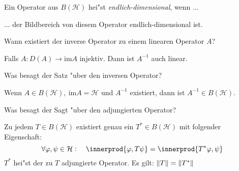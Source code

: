 \documentclass[9pt]{article}
\DeclarePairedDelimiter{\innerprod}\langle\rangle
\newcommand{\Hi}{\mathcal{H}}
\newenvironment{field}{}{\newpage}
\newif\ifnote
\newenvironment{note}{\notetrue}{\notefalse}
\newcommand{\localtag}{}
\newcommand{\globaltag}{}
\newcommand{\uuid}{}
\newcommand{\tags}[1]{
    \ifnote 
        \renewcommand{\localtag}{#1}
    \else
        \renewcommand{\globaltag}{#1}
    \fi 
    }
\newcommand{\xplain}[1]{\renewcommand{\uuid}{#1}}
\begin{document}
	\begin{note}
		\xplain{b514ddca-b0be-4779-b1ea-10bc1ff4d0f9}
		\tags{6.1.8}
		
		\begin{field}  %
			Ein Operator aus $B(\Hi)$ hei"st \textit{endlich-dimensional}, wenn ...
		\end{field}
		
		\begin{field}  %
			... der Bildbereich von diesem Operator endlich-dimensional ist.
		\end{field}
	\end{note}
	\begin{note}
		\xplain{0024bfb9-70b6-40a3-8cb4-8675d0a285cd}
		\tags{6.1.9,6.1.10, inverse}
		
		\begin{field}  %
			Wann existiert der inverse Operator zu einem linearen Operator $A$?  
		\end{field}
		
		\begin{field}  %
			Falls $A: D(A) \rightarrow \text{im}A$ injektiv. Dann ist $A^{-1}$ auch linear.
		\end{field}
			
		\begin{field}  %
			Was besagt der Satz "uber den inversen Operator?
		\end{field}
		
		\begin{field}  %
			Wenn $A\in B(\Hi), \ \text{im}A=\Hi$ und $A^{-1}$ existiert, dann ist $A^{-1} \in B(\Hi)$.
		\end{field}
	\end{note}
	\begin{note}
		\xplain{d5cd0fc1-fa83-416d-b72f-f89f21b26f67}
		\tags{6.2.1, adjungierte-operator}
		
		\begin{field}  %
			Was besagt der Sagt "uber den adjungierten Operator?
		\end{field}
		
		\begin{field}  %
			Zu jedem $T \in B(\Hi)$ existiert genau ein $T^*\in B(\Hi)$ mit folgender Eigenschaft:
			\begin{equation*}
				\forall \varphi, \psi \in \Hi: \quad \innerprod{\varphi, T\psi} = \innerprod{T^*\varphi, \psi}
			\end{equation*}
			$T^*$ hei"st der zu $T$ adjungierte Operator. Es gilt: $\norm{T}= \norm{T^*}$
		\end{field}
	\end{note}
\end{document}
